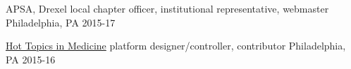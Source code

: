 
\begin{cvhonors}

\cvhonor
{APSA, Drexel local chapter}
{officer, institutional representative, webmaster}
{Philadelphia, PA}
{2015-17}

\cvhonor
{\href{https://youtu.be/pUT4e4QZEpY}{Hot Topics in Medicine}}
{platform designer/controller, contributor}
{Philadelphia, PA}
{2015-16}
\end{cvhonors}